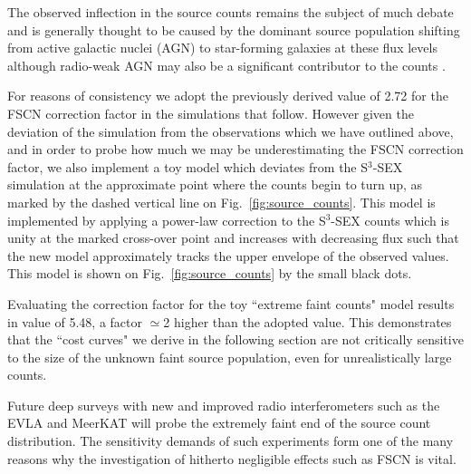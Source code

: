 \documentclass{aa}
\begin{document}
The observed inflection in the source counts remains the subject of much debate and is generally thought to be caused by the dominant source population shifting from active galactic nuclei (AGN) to star-forming galaxies at these flux levels \citep[e.g.][]{Padovani-VLA-Chandra-DFS} although radio-weak AGN may also be a significant contributor to the counts \citep{Simpson-Subaru-XMM}. 

For reasons of consistency we adopt the previously derived value of 2.72 for the FSCN correction factor in the simulations that follow. However given the deviation of the simulation from the observations which we have outlined above, and in order to probe how much we may be underestimating the FSCN correction factor, we also implement a toy model which deviates from the S$^{3}$-SEX simulation at the approximate point where the counts begin to turn up, as marked by the dashed vertical line on Fig.~\ref{fig:source_counts}. This model is implemented by applying a power-law correction to the S$^{3}$-SEX counts which is unity at the marked cross-over point and increases with decreasing flux such that the new model approximately tracks the upper envelope of the observed values. This model is shown on Fig.~\ref{fig:source_counts} by the small black dots. 

Evaluating the correction factor for the toy ``extreme faint counts" model results in value of 5.48, a factor $\simeq$2 higher than the adopted value. This demonstrates that the ``cost curves" we derive in the following section are not critically sensitive to the size of the unknown faint source population, even for unrealistically large counts.

Future deep surveys with new and improved radio interferometers such as the EVLA and MeerKAT \citep[e.g.][]{Jarvis-MeerKAT-SALT,Heywood-MESMER} will probe the extremely faint end of the source count distribution. The sensitivity demands of such experiments form one of the many reasons why the investigation of hitherto negligible effects such as FSCN is vital.
\end{document}
